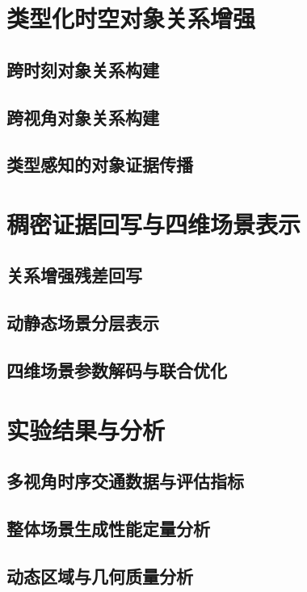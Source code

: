 \section{类型化时空对象关系增强}

\subsection{跨时刻对象关系构建}

\subsection{跨视角对象关系构建}

\subsection{类型感知的对象证据传播}

\section{稠密证据回写与四维场景表示}

\subsection{关系增强残差回写}

\subsection{动静态场景分层表示}

\subsection{四维场景参数解码与联合优化}

\section{实验结果与分析}

\subsection{多视角时序交通数据与评估指标}

\subsection{整体场景生成性能定量分析}

\subsection{动态区域与几何质量分析}

